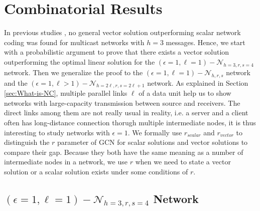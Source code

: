 \chapter{Combinatorial Results} \label{chap:comb_res}

In previous studies \cite{Wachter-Zeh:2018}, no general vector solution
outperforming scalar network coding was found for multicast networks
with $h=3$ messages. Hence, we start with a probabilistic argument
to prove that there exists a vector solution outperforming the optimal
linear solution for the $\left(\epsilon=1,\ell=1\right)-\mathcal{N}_{h=3,r,s=4}$
network. Then we generalize the proof to the $\left(\epsilon=1,\ell=1\right)-\mathcal{N}_{h,r,s}$
network and the $\left(\epsilon=1,\ell>1\right)-\mathcal{N}_{h=2\ell,r,s=2\ell+1}$
network. As explained in Section \ref{sec:What-is-NC}, multiple parallel
links $\ell$ of a data unit help us to show networks with large-capacity
transmission between source and receivers. The direct links among
them are not really usual in reality, i.e. a server and a client often
has long-distance connection thorugh multiple intermediate nodes,
it is thus interesting to study networks with $\epsilon=1$. We formally
use $r_{scalar}$ and $r_{vector}$ to distinguish the $r$ parameter
of GCN for scalar solutions and vector solutions to compare their
gap. Because they both have the same meaning as a number of intermediate
nodes in a network, we use $r$ when we need to state a vector solution
or a scalar solution exists under some conditions of $r$.

\section{$\left(\epsilon=1,\ell=1\right)-\mathcal{N}_{h=3,r,s=4}$ Network
\label{sec:Network_e1l1h3rs4}}

